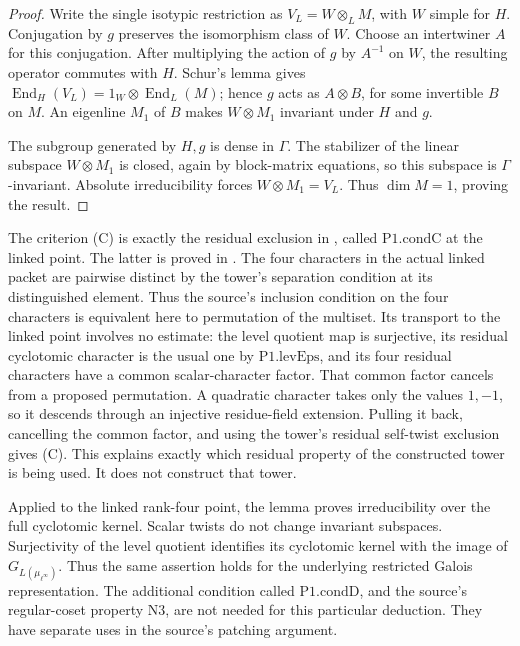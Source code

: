 \begin{proof}
Write the single isotypic restriction as
\(V_L=W\otimes_L M\), with \(W\) simple for \(H\).
Conjugation by \(g\) preserves the isomorphism class of \(W\).
Choose an intertwiner \(A\) for this conjugation.
After multiplying the action of \(g\) by \(A^{-1}\) on \(W\),
the resulting operator commutes with \(H\).
Schur's lemma gives
\(\operatorname{End}_H(V_L)=1_W\otimes\operatorname{End}_L(M)\);
hence \(g\) acts as \(A\otimes B\), for some invertible \(B\) on \(M\).
An eigenline \(M_1\) of \(B\) makes \(W\otimes M_1\) invariant
under \(H\) and \(g\).

The subgroup generated by \(H,g\) is dense in \(\Gamma\).
The stabilizer of the linear subspace \(W\otimes M_1\) is closed,
again by block-matrix equations, so this subspace is
\(\Gamma\)-invariant. Absolute irreducibility forces
\(W\otimes M_1=V_L\). Thus \(\dim M=1\), proving the result.
\end{proof}

The criterion (C) is exactly the residual exclusion in
, called
\(\mathrm{P1.condC}\) at the linked point.
The latter is proved in
.
The four characters in the actual linked packet are pairwise distinct
by the tower's separation condition at its distinguished element.
Thus the source's inclusion condition on the four characters is
equivalent here to permutation of the multiset.
Its transport to the linked point involves no estimate:
the level quotient map is surjective, its residual cyclotomic
character is the usual one by \(\mathrm{P1.levEps}\), and its
four residual characters have a common scalar-character factor.
That common factor cancels from a proposed permutation.
A quadratic character takes only the values \(1,-1\), so it descends
through an injective residue-field extension.
Pulling it back, cancelling the common factor, and using the
tower's residual self-twist exclusion gives (C).
This explains exactly which residual property of the constructed
tower is being used. It does not construct that tower.

Applied to the linked rank-four point, the lemma proves
irreducibility over the full cyclotomic kernel.
Scalar twists do not change invariant subspaces.
Surjectivity of the level quotient identifies its cyclotomic
kernel with the image of \(G_{L(\mu_{\ell^\infty})}\).
Thus the same assertion holds for the underlying restricted
Galois representation. The additional condition called
\(\mathrm{P1.condD}\), and the source's regular-coset property
\(\mathrm{N3}\), are not needed for this particular deduction.
They have separate uses in the source's patching argument.

